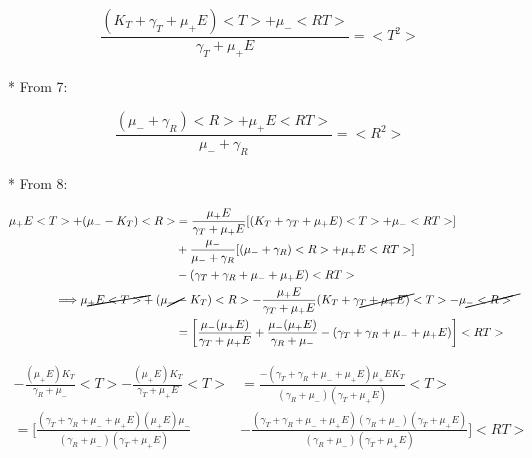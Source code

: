 \documentclass{article}
\begin{document}
\begin{equation}
    \frac{(K_T + \gamma_T + \mu_+E)<T> + \mu_-<RT>}{\gamma_T + \mu_+E} = <T^2>
\end{equation}
\\*
From 7:

\begin{equation}
    \frac{(\mu_- + \gamma_R)<R> + \mu_+E<RT>}{\mu_- + \gamma_R} = <R^2>
\end{equation}
\\*
From 8:

\begin{align*}
    \mu_+E<T> + (\mu_- - K_T)<R> &= \frac{\mu_+E}{\gamma_T + \mu_+E}[(K_T + \gamma_T + \mu_+E)<T> + \mu_-<RT>]\\
                                 &+ \frac{\mu_-}{\mu_- + \gamma_R}[(\mu_- + \gamma_R)<R> + \mu_+E<RT>]\\
                                 &- (\gamma_T + \gamma_R + \mu_- + \mu_+E)<RT>\\
    \Longrightarrow \cancel{\mu_+E<T>} + (\cancel{\mu_-} &- K_T)<R> - \frac{\mu_+E}{\gamma_T + \mu_+E}(K_T + \cancel{\gamma_T + \mu_+E})<T> - \cancel{\mu_-<R>}\\
                                                         &=\left[ \frac{\mu_-(\mu_+E)}{\gamma_T + \mu_+E} + \frac{\mu_-(\mu_+E)}{\gamma_R + \mu_-} - (\gamma_T + \gamma_R + \mu_- + \mu_+E)\right]<RT>
\end{align*}

\begin{align*}
    -\frac{(\mu_+E)K_T}{\gamma_R + \mu_-}<T> - \frac{(\mu_+E)K_T}{\gamma_T + \mu_+E}<T> &= \frac{- (\gamma_T + \gamma_R + \mu_- + \mu_+E)\mu_+EK_T}{(\gamma_R + \mu_-)(\gamma_T + \mu_+E)}<T>\\
    =\bigg[ \frac{(\gamma_T + \gamma_R + \mu_- + \mu_+E)(\mu_+E)\mu_-}{(\gamma_R + \mu_-)(\gamma_T + \mu_+E)} &- \frac{(\gamma_T + \gamma_R + \mu_- + \mu_+E)(\gamma_R + \mu_-)(\gamma_T + \mu_+E)}{(\gamma_R + \mu_-)(\gamma_T + \mu_+E)}\bigg] <RT>
\end{align*}
\end{document}
